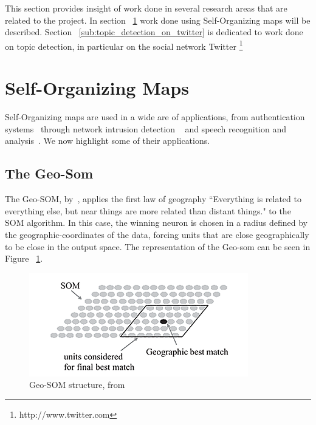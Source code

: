 
This section provides insight of work done in several research areas that are related to the project. In section ~\ref{sec:self_organizing_maps} work done using Self-Organizing maps will be described. Section ~\ref{sub:topic_detection_on_twitter} is dedicated to work done on topic detection, in particular on the social network Twitter \footnote{http://www.twitter.com}

\section{Self-Organizing Maps} 
\label{sec:self_organizing_maps}
Self-Organizing maps are used in a wide are of applications, from authentication systems~\cite{Dozono2012} through network intrusion detection ~\cite{intrusion_som} and speech recognition and analysis~\cite{phonetic_typewiter}. We now highlight some of their applications.

\subsection{The Geo-Som} 
\label{sub:types_of_soms}
The Geo-SOM, by~\citet{Bacao2005}, applies the first law of geography “Everything is related to everything else, but near things are more related than distant things." to the SOM algorithm. In this case, the winning neuron is chosen in a radius defined by the geographic-coordinates of the data, forcing units that are close geographically to be close in the output space. The representation of the Geo-som can be seen in Figure ~\ref{fig:geo_som}.

\begin{figure}[tb]
  \begin{center}
    \includegraphics[]{images/6_geo-som.png}
  \end{center}
  \caption{Geo-SOM structure, from~\citet{Bacao2005}}
  \label{fig:geo_som}
\end{figure}


